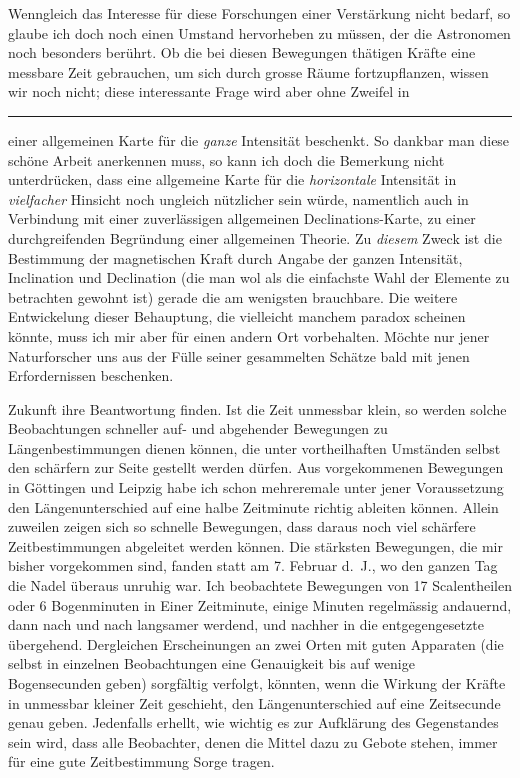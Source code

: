 Wenngleich das Interesse für diese Forschungen einer Verstärkung nicht bedarf, so glaube ich doch noch einen Umstand hervorheben zu müssen, der die Astronomen noch besonders berührt. Ob die bei diesen Bewegungen thätigen Kräfte eine messbare Zeit gebrauchen, um sich durch grosse Räume fortzupflanzen, wissen wir noch nicht; diese interessante Frage wird aber ohne Zweifel in
\par\vfill
\begingroup
\footnotesize
\noindent\rule{.252\linewidth}{.35pt}\par
\nobreak\vspace{2mm}
\noindent einer allgemeinen Karte für die \textit{ganze} Intensität beschenkt. So dankbar man diese schöne Arbeit anerkennen muss, so kann ich doch die Bemerkung nicht unterdrücken, dass eine allgemeine Karte für die \textit{horizontale} Intensität in \textit{vielfacher} Hinsicht noch ungleich nützlicher sein würde, namentlich auch in Verbindung mit einer zuverlässigen allgemeinen Declinations-Karte, zu einer durchgreifenden Begründung einer allgemeinen Theorie. Zu \textit{diesem} Zweck ist die Bestimmung der magnetischen Kraft durch Angabe der ganzen Intensität, Inclination und Declination (die man wol als die einfachste Wahl der Elemente zu betrachten gewohnt ist) gerade die am wenigsten brauchbare. Die weitere Entwickelung dieser Behauptung, die vielleicht manchem paradox scheinen könnte, muss ich mir aber für einen andern Ort vorbehalten. Möchte nur jener Naturforscher uns aus der Fülle seiner gesammelten Schätze bald mit jenen Erfordernissen beschenken.\par
\endgroup
\GaussVSourceGathering{68\textsuperscript{*}}
\clearpage
{}
\noindent Zukunft ihre Beantwortung finden. Ist die Zeit unmessbar klein, so werden solche Beobachtungen schneller auf- und abgehender Bewegungen zu Längenbestimmungen dienen können, die unter vortheilhaften Umständen selbst den schärfern zur Seite gestellt werden dürfen. Aus vorgekommenen Bewegungen in Göttingen und Leipzig habe ich schon mehreremale unter jener Voraussetzung den Längenunterschied auf eine halbe Zeitminute richtig ableiten können. Allein zuweilen zeigen sich so schnelle Bewegungen, dass daraus noch viel schärfere Zeitbestimmungen abgeleitet werden können. Die stärksten Bewegungen, die mir bisher vorgekommen sind, fanden statt am 7. Februar d.\ J., wo den ganzen Tag die Nadel überaus unruhig war. Ich beobachtete Bewegungen von 17 Scalentheilen oder 6 Bogenminuten in Einer Zeitminute, einige Minuten regelmässig andauernd, dann nach und nach langsamer werdend, und nachher in die entgegengesetzte übergehend. Dergleichen Erscheinungen an zwei Orten mit guten Apparaten (die selbst in einzelnen Beobachtungen eine Genauigkeit bis auf wenige Bogensecunden geben) sorgfältig verfolgt, könnten, wenn die Wirkung der Kräfte in unmessbar kleiner Zeit geschieht, den Längenunterschied auf eine Zeitsecunde genau geben. Jedenfalls erhellt, wie wichtig es zur Aufklärung des Gegenstandes sein wird, dass alle Beobachter, denen die Mittel dazu zu Gebote stehen, immer für eine gute Zeitbestimmung Sorge tragen.

